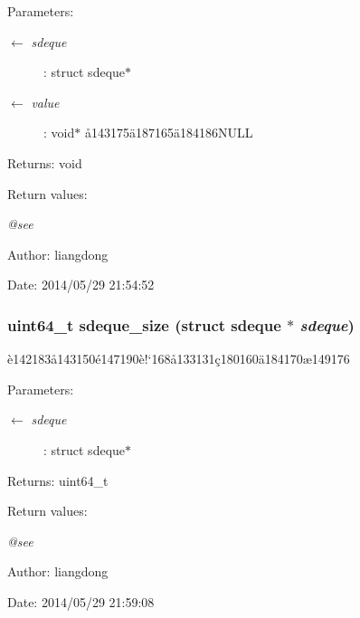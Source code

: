 \begin{Desc}
\item[Parameters:]
\begin{description}
\item[\mbox{$\leftarrow$} {\em sdeque}]: struct sdeque$\ast$ \item[\mbox{$\leftarrow$} {\em value}]: void$\ast$ \aa{}143175\"{a}187165\"{a}184186NULL \end{description}
\end{Desc}
\begin{Desc}
\item[Returns:]void \end{Desc}
\begin{Desc}
\item[Return values:]
\begin{description}
\item[{\em @see}]\end{description}
\end{Desc}
\begin{Desc}
\item[Author:]liangdong \end{Desc}
\begin{Desc}
\item[Date:]2014/05/29 21:54:52 \end{Desc}
\subsubsection{\setlength{\rightskip}{0pt plus 5cm}uint64\_\-t sdeque\_\-size (struct sdeque $\ast$ {\em sdeque})}\label{sdeque_8c_a8}


\`{e}142183\aa{}143150\'{e}147190\`{e}!`168\aa{}133131\c{c}180160\"{a}184170\ae{}149176 

\begin{Desc}
\item[Parameters:]
\begin{description}
\item[\mbox{$\leftarrow$} {\em sdeque}]: struct sdeque$\ast$ \end{description}
\end{Desc}
\begin{Desc}
\item[Returns:]uint64\_\-t \end{Desc}
\begin{Desc}
\item[Return values:]
\begin{description}
\item[{\em @see}]\end{description}
\end{Desc}
\begin{Desc}
\item[Author:]liangdong \end{Desc}
\begin{Desc}
\item[Date:]2014/05/29 21:59:08 \end{Desc}
